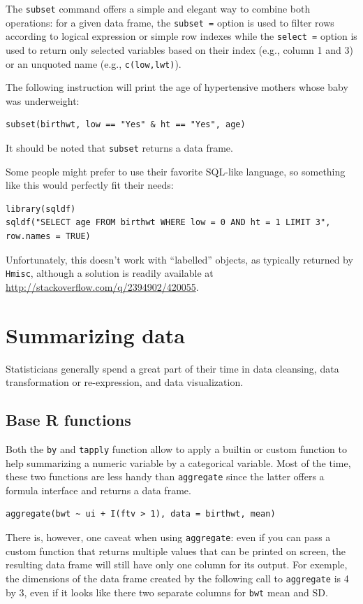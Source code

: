 \documentclass[a4paper,twoside]{book}
\renewcommand{\texttt}[1]{\lstinline{#1}}
\begin{document}
The \texttt{subset} command offers a simple and elegant way to combine both
operations: for a given data frame, the \texttt{subset =} option is used to
filter rows according to logical expression or simple row indexes while the
\texttt{select =} option is used to return only selected variables based on
their index (e.g., column 1 and 3) or an unquoted name (e.g.,
\texttt{c(low,lwt)}). 

The following instruction will print the age of hypertensive mothers whose
baby was underweight:
\begin{verbatim}
subset(birthwt, low == "Yes" & ht == "Yes", age)
\end{verbatim}
It should be noted that \texttt{subset} returns a data frame.

Some people might prefer to use their favorite SQL-like language, so
something like this would perfectly fit their needs:
\begin{verbatim}
library(sqldf)
sqldf("SELECT age FROM birthwt WHERE low = 0 AND ht = 1 LIMIT 3", row.names = TRUE)
\end{verbatim}

Unfortunately, this doesn't work with ``labelled'' objects, as typically
returned by \texttt{Hmisc}, although a solution is readily available at \url{http://stackoverflow.com/q/2394902/420055}.

\section{Summarizing data}
Statisticians generally spend a great part of their time in data
cleansing, data transformation or re-expression\autocite{hoaglin83},
and data visualization. 

\subsection{Base R functions}
Both the \texttt{by} and \texttt{tapply} function allow to apply a builtin
or custom function to help summarizing a numeric variable by a categorical
variable. Most of the time, these two functions are less handy than
\texttt{aggregate} since the latter offers a formula interface and returns a
data frame. 

\begin{verbatim}
aggregate(bwt ~ ui + I(ftv > 1), data = birthwt, mean)
\end{verbatim}

There is, however, one caveat when using \texttt{aggregate}: even if you can pass a
custom function that returns multiple values that can be printed on screen,
the resulting data frame will still have only one column for its output. For
exemple, the dimensions of the data frame created by the following call to
\texttt{aggregate} is 4 by 3, even if it looks like there two separate
columns for \texttt{bwt} mean and SD.
\end{document}
